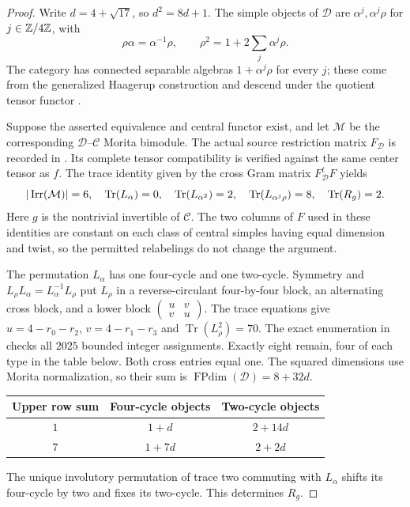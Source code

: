 \begin{proof}
Write $d=4+\sqrt{17}$, so $d^2=8d+1$. The simple objects of
$\mathcal D$ are $\alpha^j,\alpha^j\rho$ for $j\in\mathbb Z/4\mathbb Z$, with
\[
 \rho\alpha=\alpha^{-1}\rho,
 \qquad \rho^2=1+2\sum_j\alpha^j\rho.
\]
The category has connected separable algebras $1+\alpha^j\rho$ for
every $j$; these come from the generalized Haagerup construction and
descend under the quotient tensor functor
\cite[Section~2.4 and Example~4.4]{GIcenters}.

Suppose the asserted equivalence and central functor exist, and let
$\mathcal M$ be the corresponding $\mathcal D$--$\mathcal C$ Morita
bimodule. The actual source restriction matrix $F_{\mathcal D}$ is
recorded in
.
Its complete tensor compatibility is verified against the same center
tensor as $f$. The trace identity given by the cross Gram matrix
$F_{\mathcal D}^{t}F$ yields
\[
 |\operatorname{Irr}(\mathcal M)|=6,\quad
 \operatorname{Tr}(L_\alpha)=0,\quad
 \operatorname{Tr}(L_{\alpha^2})=2,\quad
 \operatorname{Tr}(L_{\alpha^j\rho})=8,\quad
 \operatorname{Tr}(R_g)=2.
\]
Here $g$ is the nontrivial invertible of $\mathcal C$. The two columns
of $F$ used in these identities are constant on each class of central
simples having equal dimension and twist, so the permitted relabelings
do not change the argument.

The permutation $L_\alpha$ has one four-cycle and one two-cycle.
Symmetry and $L_\rho L_\alpha=L_\alpha^{-1}L_\rho$ put $L_\rho$ in
a reverse-circulant four-by-four block, an alternating cross block, and
a lower block $\left(\begin{smallmatrix}u&v\\v&u\end{smallmatrix}\right)$.
The trace equations give
$u=4-r_0-r_2$, $v=4-r_1-r_3$ and
$\operatorname{Tr}(L_\rho^2)=70$.
The exact enumeration in
checks all $2025$ bounded integer assignments. Exactly eight remain,
four of each type in the table below. Both cross entries equal one.
The squared dimensions use Morita normalization, so their sum is
$\operatorname{FPdim}(\mathcal D)=8+32d$.
\begin{center}
\begin{tabular}{@{}ccc@{}}
\toprule
Upper row sum & Four-cycle objects & Two-cycle objects\\
\midrule
$1$ & $1+d$ & $2+14d$\\
$7$ & $1+7d$ & $2+2d$\\
\bottomrule
\end{tabular}
\end{center}
The unique involutory permutation of trace two commuting with
$L_\alpha$ shifts its four-cycle by two and fixes its two-cycle.
This determines $R_g$.


\end{proof}
